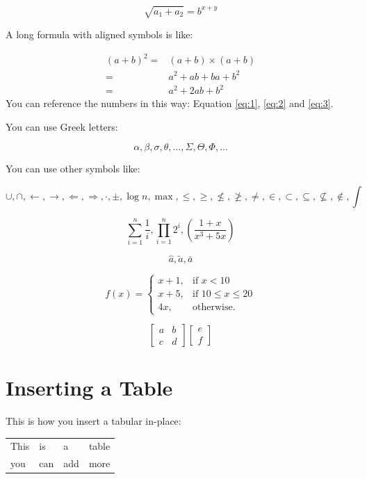 \documentclass{article}[12pt]
\begin{document}
$$\sqrt{a_1+a_2}=b^{x+y}$$

A long formula with aligned symbols is like:

\begin{align}
  (a+b)^2=& (a+b)\times(a+b) \label{eq:1}\\
  =& a^2+ab+ba+b^2 \label{eq:2}\\
  =&a^2+2ab+b^2 \label{eq:3}
\end{align}
You can reference the numbers in this way: Equation \ref{eq:1}, \ref{eq:2} and \ref{eq:3}.

You can use Greek letters:

$$\alpha, \beta, \sigma, \theta, \dots, \Sigma, \Theta, \Phi, \dots$$

You can use other symbols like:

$$\cup, \cap, \leftarrow, \rightarrow, \Leftarrow, \Rightarrow, \cdot, \pm, \log n, \max, \le, \ge, \nleq, \ngeq, \neq,\in,\subset,\subseteq,\nsubseteq,\notin,\int$$

$$\sum_{i=1}^{n}\frac{1}{i}, \prod_{i=1}^{n} 2^{i}, \left( \frac{1+x}{x^3+5x}\right)$$

$$\hat{a}, \tilde{a}, \bar{a}$$

$$f(x)=\begin{cases}
         x+1, & \mbox{if } x<10 \\
         x+5, & \mbox{if } 10\le x \le 20 \\
         4x, & \mbox{otherwise}.
       \end{cases}$$

$$\begin{bmatrix}
    a & b \\
    c & d
  \end{bmatrix}
\begin{bmatrix}
    e \\
    f
  \end{bmatrix}
$$

\section{Inserting a Table}

This is how you insert a tabular in-place:

\begin{tabular}{|l|l|l|l|}
  \hline
    This & is &a&table\\
    you  & can & add & more \\
  \hline
\end{tabular}
\end{document}
